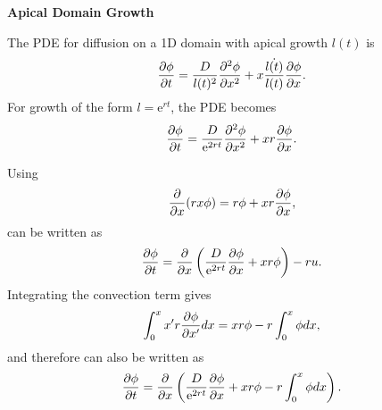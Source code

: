 \begin{center}
	\Large\textbf{Apical Domain Growth}
\end{center}

The PDE for diffusion on a 1D domain with apical growth $l(t)$ is
%
\begin{equation}
\frac{\partial \phi}{\partial t} = \frac{D}{l(t)^2} \frac{\partial^2 \phi}{\partial x^2} + x \frac{\dot{l(t)}}{l(t)} \frac{\partial \phi}{\partial x} .
\end{equation}
%
For growth of the form $l = \mathrm{e}^{rt}$, the PDE becomes
%
\begin{equation}
\frac{\partial \phi}{\partial t} = \frac{D}{\mathrm{e}^{2rt}} \frac{\partial^2 \phi}{\partial x^2} + x r \frac{\partial \phi}{\partial x} .
\label{eqn:exp_apical}
\end{equation}

Using
%
\begin{equation}
\frac{\partial }{\partial x} (rx\phi) = r\phi + xr \frac{\partial \phi}{\partial x},
\end{equation}
%
 can be written as
%
\begin{equation}
\frac{\partial \phi}{\partial t} = \frac{\partial }{\partial x}\left( \frac{D}{\mathrm{e}^{2rt}}\frac{\partial \phi}{\partial x} + xr \phi \right) - ru .
\end{equation}
%
Integrating the convection term gives
\begin{equation}
\int_0^x x'r\frac{\partial \phi}{\partial x'} dx = xr\phi - r\int_0^x \phi dx ,
\end{equation}
%
and therefore  can also be written as
%
\begin{equation}
\frac{\partial \phi}{\partial t} = \frac{\partial }{\partial x}\left( \frac{D}{\mathrm{e}^{2rt}}\frac{\partial \phi}{\partial x} + xr \phi - r\int_0^x \phi dx \right) .
\end{equation}
